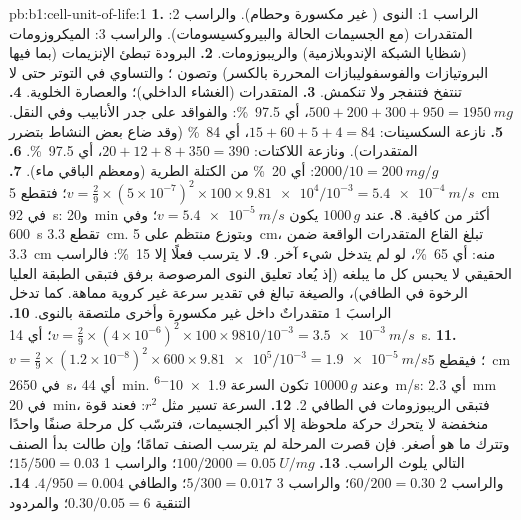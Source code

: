 \begin{solution}{pb:b1:cell-unit-of-life:1}
\textbf{1.} الراسب 1: النوى ( غير مكسورة وحطام). والراسب 2:
المتقدرات (مع الجسيمات الحالة والبيروكسيسومات). والراسب 3:
الميكروزومات (شظايا الشبكة الإندوبلازمية) والريبوزومات.
\textbf{2.} البرودة تبطئ الإنزيمات (بما فيها البروتيازات
والفوسفوليبازات المحررة بالكسر) وتصون ؛ والتساوي في التوتر
حتى لا تنتفخ  فتنفجر ولا تنكمش.
\textbf{3.} المتقدرات (الغشاء الداخلي)؛ والعصارة الخلوية.
\textbf{4.} $500 + 200 + 300 + 950 = \qty{1950}{mg}$، أي
\qty{97.5}{\%}: والفواقد على جدر الأنابيب وفي النقل.
\textbf{5.} نازعة السكسينات: $15 + 60 + 5 + 4 = 84$، أي \qty{84}{\%}
(وقد ضاع بعض النشاط بتضرر المتقدرات). ونازعة اللاكتات:
$20 + 12 + 8 + 350 = 390$، أي \qty{97.5}{\%}.
\textbf{6.} $2000/10 = \qty{200}{mg/g}$: أي \qty{20}{\%} من الكتلة الطرية (ومعظم الباقي ماء).
\textbf{7.} $v = \frac{2}{9}\times(5\times 10^{-7})^2\times 100\times
\num{9.81e4}/10^{-3} = \qty{5.4e-4}{m/s}$؛ فتقطع \qty{5}{cm} في
\qty{92}{s}: و\qty{20}{min} أكثر من كافية.
\textbf{8.} عند $1000\,g$ يكون $v = \qty{5.4e-5}{m/s}$؛ وفي
\qty{600}{s} تقطع \qty{3.3}{cm}. وبتوزع منتظم على \qty{5}{cm}، تبلغ
القاع المتقدرات الواقعة ضمن \qty{3.3}{cm} منه: أي \qty{65}{\%}، لو
لم يتدخل شيء آخر.
\textbf{9.} لا يترسب فعلًا إلا \qty{15}{\%}: فالراسب الحقيقي لا يحبس
كل ما يبلغه (إذ يُعاد تعليق النوى المرصوصة برفق فتبقى الطبقة العليا
الرخوة في الطافي)، والصيغة تبالغ في تقدير سرعة  غير كروية
مماهة. كما تدخل الراسبَ 1 متقدراتٌ داخل  غير مكسورة وأخرى
ملتصقة بالنوى.
\textbf{10.} $v = \frac{2}{9}\times(4\times 10^{-6})^2\times 100\times
9810/10^{-3} = \qty{3.5e-3}{m/s}$؛ أي \qty{14}{s}.
\textbf{11.} $v = \frac{2}{9}\times(1.2\times 10^{-8})^2\times 600\times
\num{9.81e5}/10^{-3} = \qty{1.9e-5}{m/s}$؛ فيقطع \qty{5}{cm} في
\qty{2650}{s}، أي \qty{44}{min}. وعند $\num{10000}\,g$ تكون السرعة
\qty{1.9e-6}{m/s}: أي \qty{2.3}{mm} في \qty{20}{min}، فتبقى
الريبوزومات في الطافي 2.
\textbf{12.} السرعة تسير مثل $r^2$: فعند قوة منخفضة لا يتحرك حركة
ملحوظة إلا أكبر الجسيمات، فترسّب كل مرحلة صنفًا واحدًا وتترك ما هو
أصغر. فإن قصرت المرحلة لم يترسب الصنف تمامًا؛ وإن طالت بدأ الصنف
التالي يلوث الراسب.
\textbf{13.}  $100/2000 = \qty{0.05}{U/mg}$؛ والراسب 1
$15/500 = 0.03$؛ والراسب 2 $60/200 = 0.30$؛ والراسب 3
$5/300 = 0.017$؛ والطافي $4/950 = 0.004$.
\textbf{14.} التنقية $0.30/0.05 = 6$؛ والمردود

\end{solution}
